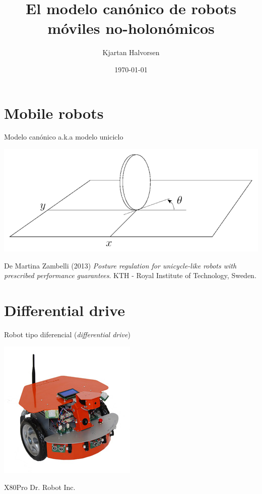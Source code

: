 \documentclass[presentation,aspectratio=169]{beamer}
\author{Kjartan Halvorsen}
\date{\today}
\title{El modelo canónico de robots móviles no-holonómicos}
\begin{document}
\maketitle

\section{Mobile robots}
\label{sec:orgb4c78bb}

\begin{frame}[label={sec:orgfc6503f}]{Modelo canónico a.k.a modelo uniciclo}
\begin{center}
 \includegraphics[width=.6\linewidth]{../figures/unicycle-kth.png}
\end{center}

\footnotesize
De Martina Zambelli (2013) \emph{Posture regulation for unicycle-like robots with prescribed performance guarantees}. KTH - Royal Institute of Technology, Sweden.
\end{frame}


\section{Differential drive}
\label{sec:org9c556a4}

\begin{frame}[label={sec:org093d6a7}]{Robot tipo diferencial (\emph{differential drive})}
\begin{center}
 \includegraphics[width=.5\linewidth]{../figures/X80Pro.jpg}
\end{center}

X80Pro Dr. Robot Inc.
\end{frame}
\end{document}
